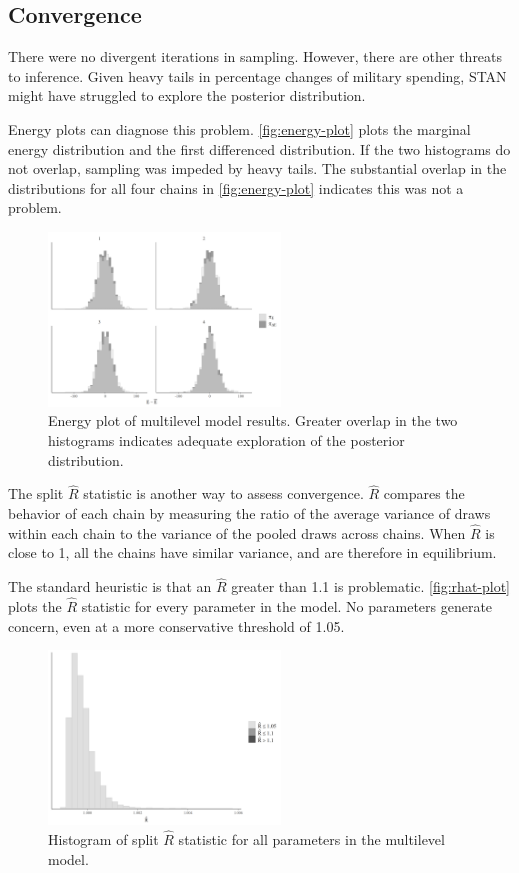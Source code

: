 \documentclass[12pt]{article}
\begin{document}
\subsection{Convergence} 


There were no divergent iterations in sampling. 
However, there are other threats to inference. 
Given heavy tails in percentage changes of military spending, STAN might have struggled to explore the posterior distribution. 


Energy plots can diagnose this problem. 
\autoref{fig:energy-plot} plots the marginal energy distribution and the first differenced distribution. 
If the two histograms do not overlap, sampling was impeded by heavy tails. 
The substantial overlap in the distributions for all four chains in \autoref{fig:energy-plot} indicates this was not a problem. 


\begin{figure}
	\centering
		\includegraphics[width=0.55\textwidth]{energy-plot.png}
	\caption{Energy plot of multilevel model results. Greater overlap in the two histograms indicates adequate exploration of the posterior distribution. }
	\label{fig:energy-plot}
\end{figure}


The split $\hat{R}$ statistic is another way to assess convergence. 
$\hat{R}$ compares the behavior of each chain by measuring the ratio of the average variance of draws within each chain to the variance of the pooled draws across chains. 
When $\hat{R}$ is close to 1, all the chains have similar variance, and are therefore in equilibrium. 


The standard heuristic is that an $\hat{R}$ greater than 1.1 is problematic. 
\autoref{fig:rhat-plot} plots the $\hat{R}$ statistic for every parameter in the model. 
No parameters generate concern, even at a more conservative threshold of 1.05. 


\begin{figure}[htbp]
	\centering
		\includegraphics[width=0.55\textwidth]{rhat-plot.png}
	\caption{Histogram of split $\hat{R}$ statistic for all parameters in the multilevel model.}
	\label{fig:rhat-plot}
\end{figure}
\end{document}
